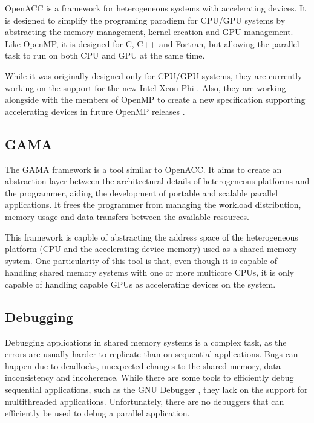 OpenACC \cite{OpenACC} is a framework for heterogeneous systems with accelerating devices. It is designed to simplify the programing paradigm for CPU/GPU systems by abstracting the memory management, kernel creation and GPU management. Like OpenMP, it is designed for C, C++ and Fortran, but allowing the parallel task to run on both CPU and GPU at the same time.

While it was originally designed only for CPU/GPU systems, they are currently working on the support for the new Intel Xeon Phi \cite{OpenACC:HPCWire}. Also, they are working alongside with the members of OpenMP to create a new specification supporting accelerating devices in future OpenMP releases \cite{OpenACC:OpenMP}.

\subsection{GAMA}

The GAMA \cite{GAMA} framework is a tool similar to OpenACC. It aims to create an abstraction layer between the architectural details of heterogeneous platforms and the programmer, aiding the development of portable and scalable parallel applications. It frees the programmer from managing the workload distribution, memory usage and data transfers between the available resources.

This framework is capble of abstracting the address space of the heterogeneous platform (CPU and the accelerating device memory) used as a shared memory system. One particularity of this tool is that, even though it is capable of handling shared memory systems with one or more multicore CPUs, it is only capable of handling \cuda capable GPUs as accelerating devices on the system.

\subsection{Debugging}

Debugging applications in shared memory systems is a complex task, as the errors are usually harder to replicate than on sequential applications. Bugs can happen due to deadlocks, unexpected changes to the shared memory, data inconsistency and incoherence. While there are some tools to efficiently debug sequential applications, such as the GNU Debugger \cite{GDB}, they lack on the support for multithreaded applications. Unfortunately, there are no debuggers that can efficiently be used to debug a parallel application.

